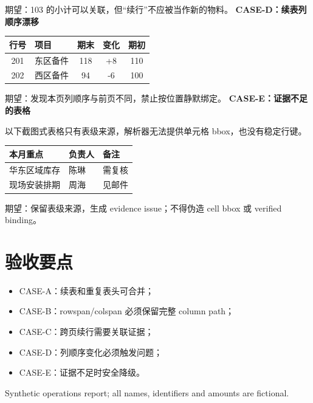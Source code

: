\documentclass[10pt,a4paper]{article}
\begin{document}
\vspace{8mm}\par\color{orange!70!black}\small 期望：103 的小计可以关联，但“续行”不应被当作新的物料。
\vspace{12mm}
{\color{blue}\large\bfseries CASE-D：续表列顺序漂移}\par\vspace{3mm}
\par\medskip\noindent\begin{tabular}{|c|p{45mm}|c|c|c|}\hline
\rowcolor{red!18} 行号 & 项目 & 期末 & 变化 & 期初\\\hline
201 & 东区备件 & 118 & +8 & 110\\\hline
202 & 西区备件 & 94 & -6 & 100\\\hline
\end{tabular}
\vspace{7mm}\par\color{red!70!black}\small 期望：发现本页列顺序与前页不同，禁止按位置静默绑定。
\newpage
{\fontsize{18}{22}\selectfont\bfseries CASE-E：证据不足的表格}\par\vspace{4mm}
以下截图式表格只有表级来源，解析器无法提供单元格 bbox，也没有稳定行键。
\par\medskip\noindent\begin{tabular}{|p{43mm}|p{43mm}|p{43mm}|}\hline
\rowcolor{gray!18} 本月重点 & 负责人 & 备注\\\hline
华东区域库存 & 陈琳 & 需复核\\\hline
现场安装排期 & 周海 & 见邮件\\\hline
\end{tabular}
\vspace{8mm}\par\color{red!70!black}\small 期望：保留表级来源，生成 evidence issue；不得伪造 cell bbox 或 verified binding。
\section*{验收要点}
\begin{itemize}
\item CASE-A：续表和重复表头可合并；
\item CASE-B：rowspan/colspan 必须保留完整 column path；
\item CASE-C：跨页续行需要关联证据；
\item CASE-D：列顺序变化必须触发问题；
\item CASE-E：证据不足时安全降级。
\end{itemize}
\vfill\scriptsize Synthetic operations report; all names, identifiers and amounts are fictional.
\end{document}
